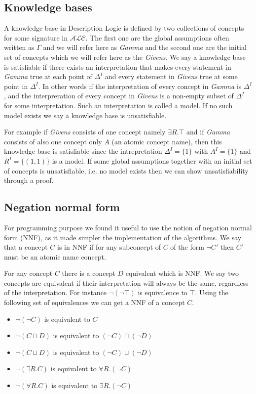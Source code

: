 \subsection{Knowledge bases}

A knowledge base in Description Logic is defined by two collections of
concepts for some signature in $\mathcal{ALC}$. The first one are the
global assumptions often written as $\Gamma$ and we will refer here
as \textit{Gamma} and the second one are the initial set of concepts
which we will refer here as the \textit{Givens}. We say a knowledge
base is satisfiable if there exists an interpretation that makes every
statement in \textit{Gamma} true at each point of $\Delta^{I}$ and
every statement in \textit{Givens} true at some point in
$\Delta^{I}$. In other words if the interpretation of every concept
in \textit{Gamma} is $\Delta^{I}$, and the interpreration of every
concept in \textit{Givens} is a non-empty subset of $\Delta^{I}$ for
some interpretation. Such an interpretation is called a model.  If no
such model exists we say a knowledge base is unsatisfiable. 

For example if \textit{Givens} consists of one concept namely $\exists
R. \top$ and if \textit{Gamma} consists of also one concept only $A$
(an atomic concept name), then this knowledge base is satisfiable
since the intrepretation $\Delta^{I} = \{1\}$ with $A^{I} = \{1\}$ and
$R^{I} = \{(1,1)\}$ is a model. If some global assumptions together
with an initial set of concepts is unsatisfiable, i.e. no model exists
then we can show unsatisfiability through a proof.

\subsection{Negation normal form}

For programming purpose we found it useful to use the notion of
negation normal form (NNF), as it made simpler the implementation of
the algorithms. We say that a concept $C$ is in NNF if for any
subconcept of $C$ of the form $\neg C'$ then $C'$ must be an atomic
name concept.

For any concept $C$ there is a concept $D$ equivalent which is NNF. We
say two concepts are equivalent if their interpretation will always be
the same, regardless of the interpretation. For instance $\neg
(\neg \top)$ is equivalence to $\top$. Using the following set of
equivalences we can get a NNF of a concept $C$.

\begin{itemize}
\item $\neg (\neg C)$ is equivalent to $C$
\item $\neg (C \sqcap D)$ is equivalent to $(\neg C) \sqcap (\neg D)$
\item $\neg (C \sqcup D)$ is equivalent to $(\neg C) \sqcup (\neg D)$
\item $\neg (\exists R . C)$ is equivalent to $\forall R . (\neg C)$
\item $\neg (\forall R . C)$ is equivalent to $\exists R . (\neg C)$
\end{itemize}

